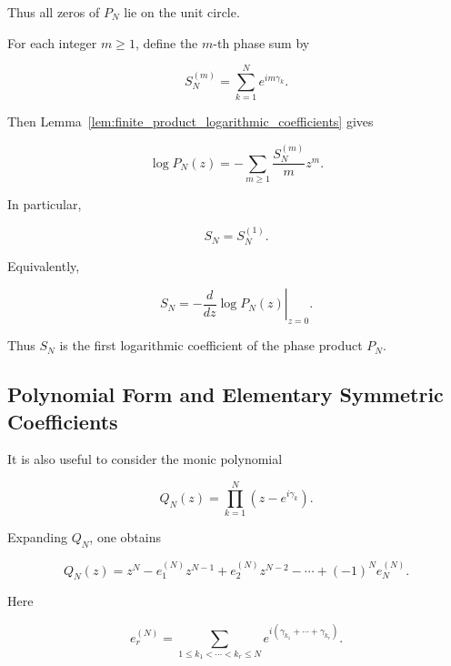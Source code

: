 \documentclass[11pt]{amsart}
\numberwithin{equation}{section}
\theoremstyle{plain}
\theoremstyle{definition}
\theoremstyle{remark}
\begin{document}
Thus all zeros of \(P_N\) lie on the unit circle.

For each integer \(m\ge 1\), define the \(m\)-th phase sum by

\begin{equation}
S_N^{(m)}
=
\sum_{k=1}^{N}
e^{im\gamma_k}.
\label{eq:higher_phase_sum_definition}
\end{equation}

Then Lemma~\ref{lem:finite_product_logarithmic_coefficients} gives

\begin{equation}
\log P_N(z)
=
-
\sum_{m\ge 1}
\frac{S_N^{(m)}}{m}
z^m.
\label{eq:phase_product_logarithmic_expansion}
\end{equation}

In particular,

\begin{equation}
S_N
=
S_N^{(1)}.
\label{eq:SN_first_phase_mode}
\end{equation}

Equivalently,

\begin{equation}
S_N
=
-
\left.
\frac{d}{dz}
\log P_N(z)
\right|_{z=0}.
\label{eq:SN_logarithmic_derivative}
\end{equation}

Thus \(S_N\) is the first logarithmic coefficient of the phase product
\(P_N\).

\subsection{Polynomial Form and Elementary Symmetric Coefficients}
\label{subsec:elementary_symmetric_coefficients}

It is also useful to consider the monic polynomial

\begin{equation}
Q_N(z)
=
\prod_{k=1}^{N}
\left(z-e^{i\gamma_k}\right).
\label{eq:monic_phase_polynomial}
\end{equation}

Expanding \(Q_N\), one obtains

\begin{equation}
Q_N(z)
=
z^N
-
e_1^{(N)}z^{N-1}
+
e_2^{(N)}z^{N-2}
-
\cdots
+
(-1)^N e_N^{(N)}.
\label{eq:monic_phase_polynomial_expansion}
\end{equation}

Here

\begin{equation}
e_r^{(N)}
=
\sum_{1\le k_1<\cdots<k_r\le N}
e^{i(\gamma_{k_1}+\cdots+\gamma_{k_r})}.
\label{eq:elementary_symmetric_phase_coefficients}
\end{equation}
\end{document}
